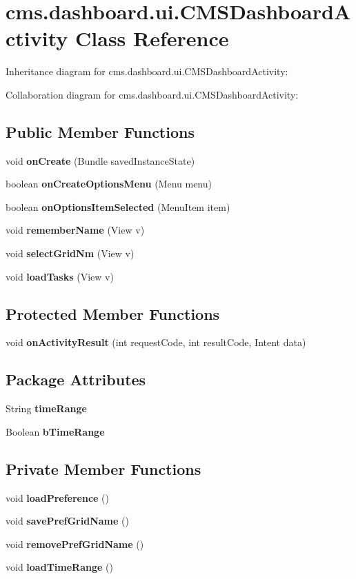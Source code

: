 \section{cms.\-dashboard.\-ui.\-C\-M\-S\-Dashboard\-Activity \-Class \-Reference}
\label{classcms_1_1dashboard_1_1ui_1_1_c_m_s_dashboard_activity}


\-Inheritance diagram for cms.\-dashboard.\-ui.\-C\-M\-S\-Dashboard\-Activity\-:


\-Collaboration diagram for cms.\-dashboard.\-ui.\-C\-M\-S\-Dashboard\-Activity\-:
\subsection*{\-Public \-Member \-Functions}
\begin{DoxyCompactItemize}
\item 
void {\bf on\-Create} (\-Bundle saved\-Instance\-State)
\item 
boolean {\bf on\-Create\-Options\-Menu} (\-Menu menu)
\item 
boolean {\bf on\-Options\-Item\-Selected} (\-Menu\-Item item)
\item 
void {\bf remember\-Name} (\-View v)
\item 
void {\bf select\-Grid\-Nm} (\-View v)
\item 
void {\bf load\-Tasks} (\-View v)
\end{DoxyCompactItemize}
\subsection*{\-Protected \-Member \-Functions}
\begin{DoxyCompactItemize}
\item 
void {\bf on\-Activity\-Result} (int request\-Code, int result\-Code, \-Intent data)
\end{DoxyCompactItemize}
\subsection*{\-Package \-Attributes}
\begin{DoxyCompactItemize}
\item 
\-String {\bf time\-Range}
\item 
\-Boolean {\bf b\-Time\-Range}
\end{DoxyCompactItemize}
\subsection*{\-Private \-Member \-Functions}
\begin{DoxyCompactItemize}
\item 
void {\bf load\-Preference} ()
\item 
void {\bf save\-Pref\-Grid\-Name} ()
\item 
void {\bf remove\-Pref\-Grid\-Name} ()
\item 
void {\bf load\-Time\-Range} ()
\end{DoxyCompactItemize}
